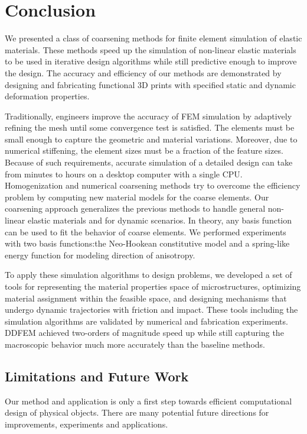 \chapter{Conclusion}
We presented a class of coarsening methods for finite element simulation of elastic materials.
These methods speed up the simulation of non-linear elastic materials to be used in iterative design algorithms while still predictive enough to improve the design.
The accuracy and efficiency of our methods are demonstrated by designing and fabricating functional 3D prints with specified static and dynamic deformation properties.

Traditionally, engineers improve the accuracy of FEM simulation by adaptively refining the mesh until some convergence test is satisfied.
The elements must be small enough to capture the geometric and material variations.
Moreover, due to numerical stiffening, the element sizes must be a fraction of the feature sizes.
Because of such requirements, accurate simulation of a detailed design can take from minutes to hours on a desktop computer with a single CPU.
Homogenization and numerical coarsening methods try to overcome the efficiency problem by computing new material models for the coarse elements.
Our coarsening approach generalizes the previous methods to handle general non-linear elastic materials and for dynamic scenarios. In theory, any basis function can be used to fit the behavior of coarse elements. We performed experiments with two basis functions:the Neo-Hookean constitutive model and a spring-like energy function for modeling direction of anisotropy.

To apply these simulation algorithms to design problems, we developed a set of tools for representing the material properties space of microstructures, optimizing material assignment within the feasible space, and designing mechanisms that undergo dynamic trajectories with friction and impact.
These tools including the simulation algorithms are validated by numerical and fabrication experiments.
DDFEM achieved two-orders of magnitude speed up while still capturing the macroscopic behavior much more accurately than the baseline methods.
\section{Limitations and Future Work}
Our method and application is only a first step towards efficient computational design of physical objects.
There are many potential future directions for improvements, experiments and applications.

